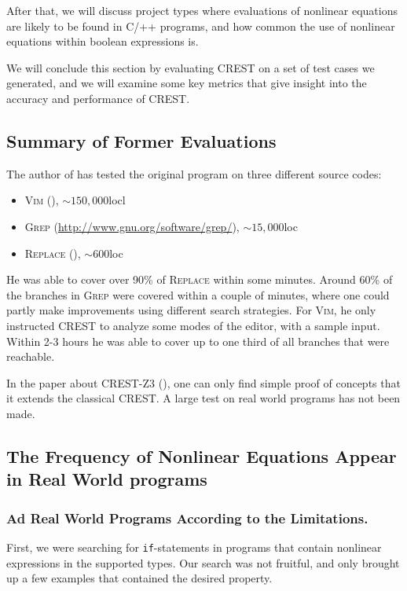 \documentclass[oribibl, twocolumn]{llncs}
\begin{document}
After that, we will discuss project types where evaluations of
nonlinear equations are likely to be found in \textsc{C/++} programs, and how common the use
of nonlinear equations within boolean expressions is.

We will conclude this section by evaluating CREST on a set of test cases we generated, and we will
examine some key metrics that give insight into the accuracy and performance of CREST.

\subsection{Summary of Former Evaluations}

The author of \cite{CREST} has tested the original program on three
different source codes:

\begin{itemize}
  \item \textsc{Vim} (\cite{oualline2001vi}), $\sim 150,000$locl
  \item \textsc{Grep} (\url{http://www.gnu.org/software/grep/}), $\sim
    15,000$loc
  \item \textsc{Replace} (\cite{harrold2010siemens}), $\sim 600$loc
\end{itemize}

He was able to cover over 90\% of \textsc{Replace} within some
minutes. Around 60\% of the branches in \textsc{Grep} were covered
within a couple of minutes, where one could partly make improvements
using different search strategies. For \textsc{Vim}, he only instructed \textsc{CREST} to analyze some modes of the editor, with a
sample input. Within 2-3 hours he was able to cover up to one third
of all branches that were reachable.

In the paper about \textsc{CREST-Z3} (\cite{CRESTZ3}), one can only
find simple proof of concepts that it extends the classical
\textsc{CREST}. A large test on real world programs has not been made.

\subsection{The Frequency of Nonlinear Equations Appear in Real World
  programs}

\subsubsection{Ad Real World Programs According to the Limitations.}
First, we were searching for \texttt{if}-statements in programs that
contain nonlinear expressions in the supported types. Our search was
not fruitful, and only brought up a few examples that contained the
desired property.
\end{document}
